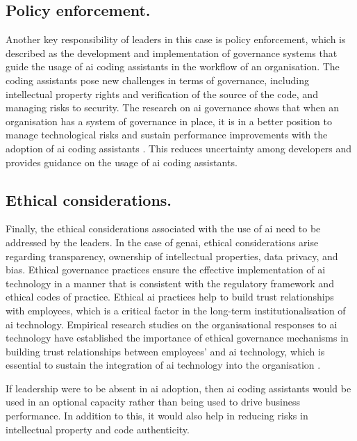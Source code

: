 \subsection {Policy enforcement.}
\label{sec:Policy enforcement}
Another key responsibility of leaders in this case is policy enforcement, which is described as the development and implementation of governance systems that guide the usage of \gls{ai} coding assistants in the workflow of an organisation. The coding assistants pose new challenges in terms of governance, including intellectual property rights and verification of the source of the code, and managing risks to security. The research on \gls{ai} governance shows that when an organisation has a system of governance in place, it is in a better position to manage technological risks and sustain performance improvements with the adoption of \gls{ai} coding assistants \autocite{Schneider2023}. This reduces uncertainty among developers and provides guidance on the usage of \gls{ai} coding assistants.

\subsection {Ethical considerations.}
\label{sec:Ethical considerations}
Finally, the ethical considerations associated with the use of \gls{ai} need to be addressed by the leaders. In the case of \gls{genai}, ethical considerations arise regarding transparency, ownership of intellectual properties, data privacy, and bias. Ethical governance practices ensure the effective implementation of \gls{ai} technology in a manner that is consistent with the regulatory framework and ethical codes of practice. Ethical \gls{ai} practices help to build trust relationships with employees, which is a critical factor in the long-term institutionalisation of \gls{ai} technology. Empirical research studies on the organisational responses to \gls{ai} technology have established the importance of ethical governance mechanisms in building trust relationships between employees' and \gls{ai} technology, which is essential to sustain the integration of \gls{ai} technology into the organisation \autocite{Daly2025}.

If leadership were to be absent in \gls{ai} adoption, then \gls{ai} coding assistants would be used in an optional capacity rather than being used to drive business performance. In addition to this, it would also help in reducing risks in intellectual property and code authenticity.

